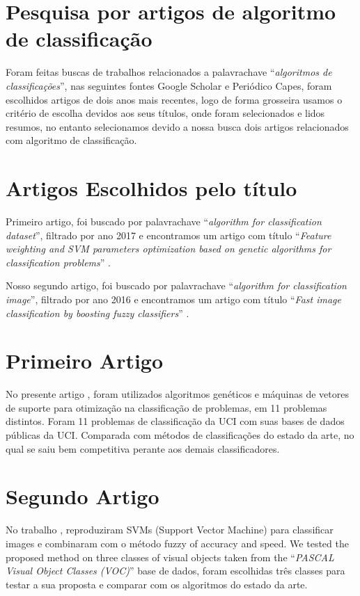 \documentclass[12pt,a4paper,letterpaper]{article}
\newcommand\wb[1]{\discretionary{#1}{#1}{#1}}
\begin{document}
\section{Pesquisa por artigos de algoritmo de classificação}

Foram feitas buscas de trabalhos relacionados a palavra\wb-chave
``\textit{algoritmos de classificações}'', nas seguintes fontes Google Scholar e
Periódico Capes, foram escolhidos artigos de dois anos mais recentes, logo de
forma grosseira usamos o critério de escolha devidos aos seus títulos, onde
foram selecionados e lidos resumos, no entanto selecionamos devido a nossa busca
dois artigos relacionados com algoritmo de classificação.

\section{Artigos Escolhidos pelo título}
Primeiro artigo, foi buscado por palavra\wb-chave ``\textit{algorithm for
classification dataset}'', filtrado por ano 2017 e encontramos um artigo com
título ``\textit{Feature weighting and SVM parameters optimization based on
genetic algorithms for classification problems}'' \autocite{PHAN2017}.

Nosso segundo artigo, foi buscado por palavra\wb-chave ``\textit{algorithm for
classification image}'', filtrado por ano 2016 e encontramos um artigo com
título ``\textit{Fast image classification by boosting fuzzy classifiers}''
\autocite{KORYTKOWSKI2016}.

\section{Primeiro Artigo}
No presente artigo \autocite{PHAN2017}, foram utilizados algoritmos genéticos e
máquinas de vetores de suporte para otimização na classificação de problemas,
em 11 problemas distintos. Foram 11 problemas de classificação da UCI com suas bases
de dados públicas da UCI. Comparada com métodos de classificações do estado da
arte, no qual se saiu bem competitiva perante aos demais classificadores.

\section{Segundo Artigo}
No trabalho \autocite{KORYTKOWSKI2016}, reproduziram SVMs (Support Vector
Machine) para classificar images e combinaram com o método fuzzy of accuracy and
speed. We tested the proposed method on three classes of visual objects taken
from the ``\textit{PASCAL Visual Object Classes (VOC)}'' base de dados, foram
escolhidas três classes para testar a sua proposta e comparar com os algoritmos
do estado da arte.

\pagebreak
\medskip
\printbibliography[
    heading=bibintoc,
    title={Referências Bibliográficas}
]
\end{document}
